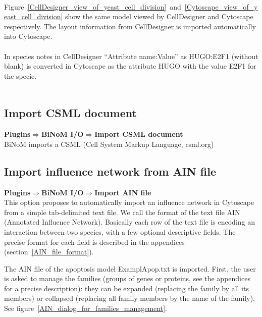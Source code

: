 \\Figure~\ref{CellDesigner_view_of_yeast_cell_division}~and~\ref{Cytoscape_view_of_yeast_cell_division} show the same model viewed by CellDesigner and Cytoscape respectively. The layout information from CellDesigner is imported automatically into Cytoscape.\\\\
In species notes in CellDesigner “Attribute name:Value” as HUGO:E2F1 (without blank) is converted in Cytoscape as the attribute HUGO with the value E2F1 for the specie.\\\\

\subsection{Import CSML document}

\textbf{Plugins$\Rightarrow$BiNoM I/O$\Rightarrow$Import CSML document}\\
BiNoM imports a CSML (Cell System Markup Language, csml.org)

\subsection{Import influence network from AIN file} \label{Import_AIN_file}

\textbf{Plugins$\Rightarrow$BiNoM I/O$\Rightarrow$Import AIN file}\\

This option proposes to automatically import an influence network in Cytoscape
from a simple tab-delimited text file. We call the format of the
text file AIN (Annotated Influence Network). Basically each row of the text file is encoding an
interaction between two species, with a few optional descriptive fields. The precise
format for each field is described in the appendices (section~\ref{AIN_file_format}). 

The AIN file of the apoptosis model ExamplApop.txt is imported. First, the user
is asked to manage the families (groups of genes or proteins, see the appendices
for a precise description): they can be expanded (replacing the family by all
its members) or collapsed (replacing all family members by the name of the
family). See figure~\ref{AIN_dialog_for_families_management}.\\\\

